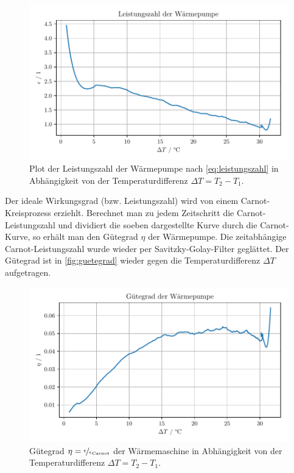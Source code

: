 \documentclass[english, ngerman]{scrartcl}
\begin{document}
\begin{figure}[H]
    \centering
    \begin{samepage}
        \includegraphics[width=0.8\linewidth]{fig/plots/leistungszahl.pdf}
        \caption[Leistungszahl Wärmepumpe]{Plot der Leistungszahl der Wärmepumpe nach \autoref{eq:leistungszahl} in Abhängigkeit von der Temperaturdifferenz $\Delta T = T_2 - T_1$.}
        \label{fig:leistungszahl}
    \end{samepage}
\end{figure}
%
Der ideale Wirkungsgrad (bzw. Leistungszahl) wird von einem Carnot-Kreisprozess erziehlt. Berechnet man zu jedem Zeitschritt die Carnot-Leistungszahl und dividiert die soeben dargestellte Kurve durch die Carnot-Kurve, so erhält man den Gütegrad $\eta$ der Wärmepumpe. Die zeitabhängige Carnot-Leistungszahl wurde wieder per Savitzky-Golay-Filter geglättet. Der Gütegrad ist in \autoref{fig:guetegrad} wieder gegen die Temperaturdifferenz $\Delta T$ aufgetragen.
%
\begin{figure}[H]
    \centering
    \begin{samepage}
        \includegraphics[width=0.8\linewidth]{fig/plots/guetegrad.pdf}
        \caption[Gütegrad Wärmepumpe]{Gütegrad $\eta = \nicefrac{\epsilon}{\epsilon_{\text{Carnot}}}$ der Wärmemaschine in Abhängigkeit von der Temperaturdifferenz $\Delta T = T_2 - T_1$.}
        \label{fig:guetegrad}
    \end{samepage}
\end{figure}
\end{document}
